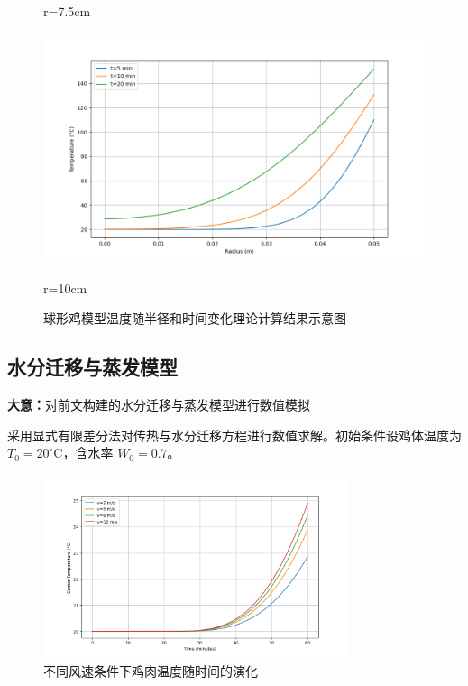 \documentclass[12pt]{article}
\begin{document}
\begin{figure}[htbp]
\begin{minipage}{0.32\linewidth}
		\centerline{r=7.5cm}
	\end{minipage}
	\begin{minipage}{0.32\linewidth}
		\vspace{3pt}
		\centerline{\includegraphics[width=\textwidth]{heat_distribution3.png}}
		\centerline{r=10cm}
	\end{minipage}
	\caption{球形鸡模型温度随半径和时间变化理论计算结果示意图}
	\label{fig:chicken}
\end{figure}

\subsection{水分迁移与蒸发模型}
\begin{summarybox}
	\textbf{大意：}对前文构建的水分迁移与蒸发模型进行数值模拟
\end{summarybox}
采用显式有限差分法对传热与水分迁移方程进行数值求解。初始条件设鸡体温度为 $T_0 = 20^\circ$C，含水率 $W_0 = 0.7$。

\begin{figure}[htbp]
\centering
\includegraphics[width=0.8\textwidth]{wind.jpg}
\caption{不同风速条件下鸡肉温度随时间的演化}
\end{figure}
\end{document}
